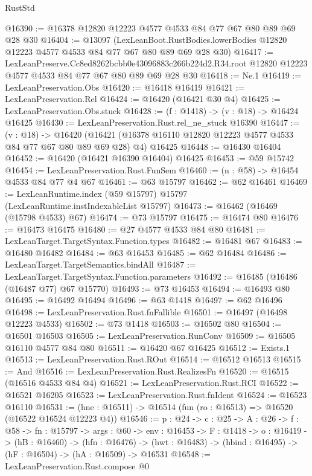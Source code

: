 \begin{lexlean}{RustStd}
\begin{coremodule}
@16390 := @16378 @12820 @12223 @4577 @4533 @84 @77 @67 @80 @89 @69 @28 @30
@16404 := @13097
    (LexLeanBoot.RustBodies.lowerBodies @12820 @12223 @4577 @4533 @84 @77 @67 @80 @89 @69 @28 @30)
@16417 := LexLeanPreserve.Cc8ed8262bcbb0e43096883c266b224d2.R34.root
    @12820
    @12223
    @4577
    @4533
    @84
    @77
    @67
    @80
    @89
    @69
    @28
    @30
@16418 := Ne.{1}
@16419 := LexLeanPreservation.Obs
@16420 := @16418 @16419
@16421 := LexLeanPreservation.Rel
@16424 := @16420 (@16421 @30 @4)
@16425 := LexLeanPreservation.Obs.stuck
@16428 := (f : @1418) -> (v : @18) -> @16424 @16425
@16430 := LexLeanPreservation.Rust.rel_ne_stuck @16390
@16447 := (v : @18) ->
  @16420 (@16421 (@16378 @16110 @12820 @12223 @4577 @4533 @84 @77 @67 @80 @89 @69 @28) @4) @16425
@16448 := @16430 @16404
@16452 := @16420 (@16421 @16390 @16404) @16425
@16453 := @59 @15742
@16454 := LexLeanPreservation.Rust.FunSem
@16460 := (n : @58) -> @16454 @4533 @84 @77 @4 @67
@16461 := @63 @15797
@16462 := @62 @16461
@16469 := LexLeanRuntime.index (@59 @15797) @15797 (LexLeanRuntime.instIndexableList @15797)
@16473 := @16462 (@16469 (@15798 @4533) @67)
@16474 := @73 @15797
@16475 := @16474 @80
@16476 := @16473 @16475
@16480 := @27 @4577 @4533 @84 @80
@16481 := LexLeanTarget.TargetSyntax.Function.types
@16482 := @16481 @67
@16483 := @16480 @16482
@16484 := @63 @16453
@16485 := @62 @16484
@16486 := LexLeanTarget.TargetSemantics.bindAll
@16487 := LexLeanTarget.TargetSyntax.Function.parameters
@16492 := @16485 (@16486 (@16487 @77) @67 @15770)
@16493 := @73 @16453
@16494 := @16493 @80
@16495 := @16492 @16494
@16496 := @63 @1418
@16497 := @62 @16496
@16498 := LexLeanPreservation.Rust.fnFallible
@16501 := @16497 (@16498 @12223 @4533)
@16502 := @73 @1418
@16503 := @16502 @80
@16504 := @16501 @16503
@16505 := LexLeanPreservation.RunConv
@16509 := @16505 @16110 @4577 @84 @80
@16511 := @16420 @67 @16425
@16512 := Exists.{1}
@16513 := LexLeanPreservation.Rust.ROut
@16514 := @16512 @16513
@16515 := And
@16516 := LexLeanPreservation.Rust.RealizesFn
@16520 := @16515 (@16516 @4533 @84 @4)
@16521 := LexLeanPreservation.Rust.RCI
@16522 := @16521 @16205
@16523 := LexLeanPreservation.Rust.fnIdent
@16524 := @16523 @16110
@16531 := (hne : @16511) -> @16514 (fun (ro : @16513) => @16520 (@16522 @16524 @12223 @4))
@16546 := {p : @24} ->
  {c : @25} ->
  {A : @26} ->
  {f : @58} ->
  {fn : @15797} ->
  {args : @60} ->
  {env : @16453} ->
  {F : @1418} ->
  {o : @16419} ->
  (hB : @16460) ->
  (hfn : @16476) -> (hwt : @16483) -> (hbind : @16495) -> (hF : @16504) -> (hA : @16509) -> @16531
@16548 := LexLeanPreservation.Rust.compose @0

\end{coremodule}
\end{lexlean}
